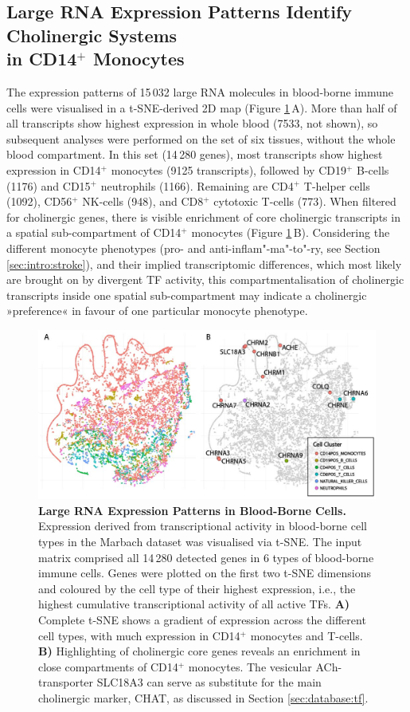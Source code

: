 \subsection{Large RNA Expression Patterns Identify Cholinergic Systems\\ in CD14$^+$ Monocytes}
The expression patterns of 15\,032 large RNA molecules in blood-borne immune cells were visualised in a t-SNE-derived 2D map (Figure \ref{fig:tsne-large}\,A). More than half of all transcripts show highest expression in whole blood (7533, not shown), so subsequent analyses were performed on the set of six tissues, without the whole blood compartment. In this set (14\,280 genes), most transcripts show highest expression in CD14$^+$ monocytes (9125 transcripts), followed by CD19$^+$ B-cells (1176) and CD15$^+$ neutrophils (1166). Remaining are CD4$^+$ T-helper cells (1092), CD56$^+$ NK-cells (948), and CD8$^+$ cytotoxic T-cells (773). When filtered for cholinergic genes, there is visible enrichment of core cholinergic transcripts in a spatial sub-compartment of CD14$^+$ monocytes (Figure \ref{fig:tsne-large}\,B). Considering the different monocyte phenotypes (pro- and anti-inflam"-ma"-to"-ry, see Section \ref{sec:intro:stroke}), and their implied transcriptomic differences, which most likely are brought on by divergent TF activity, this compartmentalisation of cholinergic transcripts inside one spatial sub-compartment may indicate a cholinergic »preference« in favour of one particular monocyte phenotype. 

\begin{figure}
\includegraphics[width=\textwidth]{figures/tsne-large}
\caption[Large RNA Expression Patterns in Blood-Borne Cells.]{\textbf{Large RNA Expression Patterns in Blood-Borne Cells.} Expression derived from transcriptional activity in blood-borne cell types in the Marbach dataset\cite{Marbach2016} was visualised via t-SNE. The input matrix comprised all 14\,280 detected genes in 6 types of blood-borne immune cells. Genes were plotted on the first two t-SNE dimensions and coloured by the cell type of their highest expression, i.e., the highest cumulative transcriptional activity of all active TFs. \textbf{A)} Complete t-SNE shows a gradient of expression across the different cell types, with much expression in CD14$^+$ monocytes and T-cells. \textbf{B)} Highlighting of cholinergic core genes reveals an enrichment in close compartments of CD14$^+$ monocytes. The vesicular ACh-transporter SLC18A3 can serve as substitute for the main cholinergic marker, CHAT, as discussed in Section \ref{sec:database:tf}.
\label{fig:tsne-large}}
\end{figure}

